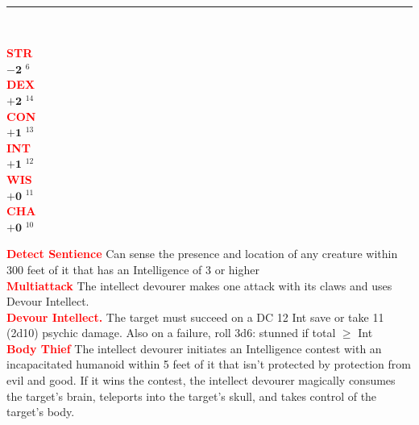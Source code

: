 \documentclass{article}
\begin{document}
\begin{adjustbox}{minipage=0.45\textwidth, margin=\fboxsep, bgimage=../images/texture2.pdf}
{\begin{minipage}[t][10.5in][t]{0.9\textwidth}
\begin{minipage}[t]{0.7\textwidth}
        \end{minipage}
        \vspace{0.025in}\\
        \rule{\textwidth}{1pt}\\
        \vspace{0.025in}
        \begin{minipage}[t]{0.2\textwidth}
            {\large
            \textcolor{red}{\textbf{STR}}\\[0.1em]
            $\mathbf{-2}$\,\,$^{6}$ \\[0.1em]
            \textcolor{red}{\textbf{DEX}}\\[0.1em]
            $\mathbf{+2}$\,\,$^{14}$ \\[0.1em]
            \textcolor{red}{\textbf{CON}}\\[0.1em]
            $\mathbf{+1}$\,\,$^{13}$ \\[0.1em]
            \textcolor{red}{\textbf{INT}}\\[0.1em]
            $\mathbf{+1}$\,\,$^{12}$ \\[0.1em]
            \textcolor{red}{\textbf{WIS}}\\[0.1em]
            $\mathbf{+0}$\,\,$^{11}$ \\[0.1em]
            \textcolor{red}{\textbf{CHA}}\\[0.1em]
            $\mathbf{+0}$\,\,$^{10}$ \\[0.1em]
            }
        \end{minipage}
        \hspace{-0.1in}
        \vline
        \hspace{0.1in}
        \begin{minipage}[t]{0.7\textwidth}
            \textcolor{red}{\textbf{Detect Sentience}} Can sense the presence and location of any creature within 300 feet of it that has an Intelligence of 3 or higher \\[0.2em]
            \textcolor{red}{\textbf{Multiattack}} The intellect devourer makes one attack with its claws and uses Devour Intellect. \\[0.2em]
            \textcolor{red}{\textbf{Devour Intellect.}}  The target must succeed on a DC 12 Int save or take 11 (2d10) psychic damage. Also on a failure, roll 3d6: stunned if total $\geq$ Int \\[0.2em]
            \textcolor{red}{\textbf{Body Thief}} The intellect devourer initiates an Intelligence contest with an incapacitated humanoid within 5 feet of it that isn't protected by protection from evil and good. If it wins the contest, the intellect devourer magically consumes the target's brain, teleports into the target's skull, and takes control of the target's body. 

\end{minipage}
\end{minipage}}
\end{adjustbox}
\end{document}
